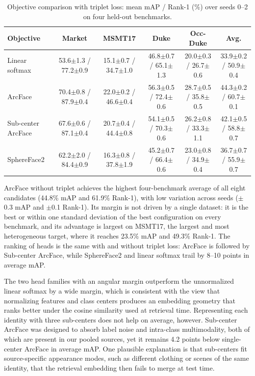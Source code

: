 \documentclass{llncs}
\newcommand{\mstd}[2]{#1{\scriptsize$\pm$#2}}
\begin{document}
\begin{table}[t]
\caption{Objective comparison with triplet loss: mean mAP / Rank-1 (\%) over seeds 0--2 on four held-out benchmarks.}
\label{tab:triplet}
\centering
\scriptsize
\setlength{\tabcolsep}{3pt}
\begin{tabular*}{\textwidth}{@{}l*{5}{@{\extracolsep{\fill}}c}@{}}
\toprule
Objective & Market & MSMT17 & Duke & Occ-Duke & Avg. \\
\midrule
Linear softmax & \mstd{53.6}{1.3} / \mstd{77.2}{0.9} & \mstd{15.1}{0.7} / \mstd{34.7}{1.0} & \mstd{46.8}{0.7} / \mstd{65.1}{1.3} & \mstd{20.0}{0.3} / \mstd{26.7}{0.6} & \mstd{33.9}{0.2} / \mstd{50.9}{0.4} \\
ArcFace & \mstd{70.4}{0.8} / \mstd{87.9}{0.4} & \mstd{22.0}{0.2} / \mstd{46.6}{0.4} & \mstd{56.3}{0.5} / \mstd{72.4}{0.6} & \mstd{28.7}{0.5} / \mstd{35.8}{0.5} & \mstd{44.3}{0.2} / \mstd{60.7}{0.1} \\
Sub-center ArcFace & \mstd{67.6}{0.6} / \mstd{87.1}{0.4} & \mstd{20.7}{0.4} / \mstd{44.4}{0.8} & \mstd{54.1}{0.5} / \mstd{70.3}{0.6} & \mstd{26.2}{0.8} / \mstd{33.3}{1.1} & \mstd{42.1}{0.5} / \mstd{58.8}{0.7} \\
SphereFace2  & \mstd{62.2}{2.0} / \mstd{84.4}{0.9} & \mstd{16.3}{0.8} / \mstd{37.8}{1.9} & \mstd{45.2}{0.7} / \mstd{66.4}{0.6} & \mstd{23.0}{0.8} / \mstd{34.9}{0.4} & \mstd{36.7}{0.7} / \mstd{55.9}{0.7} \\
\bottomrule
\end{tabular*}
\end{table}


ArcFace without triplet achieves the highest four-benchmark average of all eight candidates (44.8\% mAP and 61.9\% Rank-1), with low variation across seeds ($\pm$0.3 mAP and $\pm$0.1 Rank-1). Its margin is not driven by a single dataset: it is the best or within one standard deviation of the best configuration on every benchmark, and its advantage is largest on MSMT17, the largest and most heterogeneous target, where it reaches 23.5\% mAP and 49.3\% Rank-1. The ranking of heads is the same with and without triplet loss: ArcFace is followed by Sub-center ArcFace, while SphereFace2 and linear softmax trail by 8--10 points in average mAP.

The two head families with an angular margin outperform the unnormalized linear softmax by a wide margin, which is consistent with the view that normalizing features and class centers produces an embedding geometry that ranks better under the cosine similarity used at retrieval time. Representing each identity with three sub-centers does not help on average, however. Sub-center ArcFace was designed to absorb label noise and intra-class multimodality, both of which are present in our pooled sources, yet it remains 4.2 points below single-center ArcFace in average mAP. One plausible explanation is that sub-centers fit source-specific appearance modes, such as different clothing or scenes of the same identity, that the retrieval embedding then fails to merge at test time.
\end{document}
